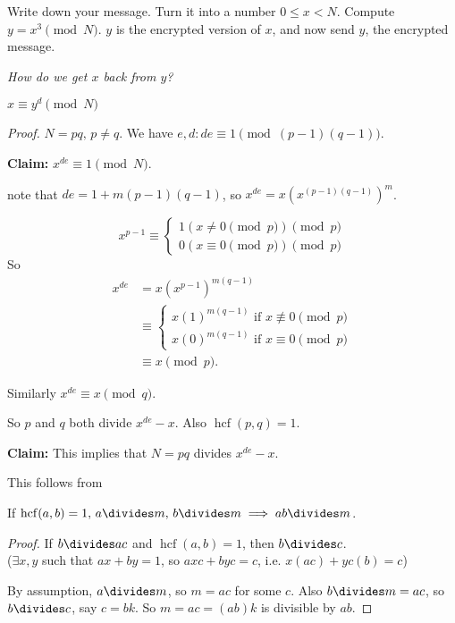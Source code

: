 \documentclass[twoside]{scrartcl}
\DeclareMathOperator{\hcf}{hcf}
\begin{document}
Write down your message. Turn it into a number $0 \leq x < N$. Compute $y= x^3 \pmod{N}$. $y$ is the encrypted version of $x$, and now send $y$, the encrypted message. 

\emph{How do we get $x$ back from $y$?}\\

\begin{theorem}
	$x \equiv y^d \pmod{N}$
\end{theorem}
\begin{proof}
$N = pq,\, p \neq q$. We have $e,d: de \equiv 1 \pmod{(p-1)(q-1)}$. 

\textbf{Claim:} $x^{de} \equiv 1 \pmod{N}$. 

note that $de = 1 + m(p-1)(q-1)$, so $x^{de} = x\left(x^{(p-1)(q-1)}\right)^m$. 

\[x^{p-1} \equiv \begin{cases}
 1 (x \neq 0 \pmod{p}) \pmod{p}\\
 0 ( x \equiv 0 \pmod{p}) \pmod{p}	
 \end{cases}
\]	
So 
\[
\begin{aligned}
  x^{de} &= x(x^{p-1})^{m(q-1)}\\
  &\equiv \begin{cases}
 x(1)^{m(q-1)} \text{ if } x \not\equiv 0 \pmod{p}\\
 x(0)^{m(q-1)} \text{ if } x \equiv 0 \pmod{p}
 \end{cases}\\
 &\equiv x \pmod{p}.	
 \end{aligned}
\]

Similarly $x^{de} \equiv x \pmod{q}$. 

So $p$ and $q$ both divide $x^{de} - x$. Also $\hcf(p,q) = 1$. 

\textbf{Claim:} This implies that $N = pq$ divides $x^{de} -x$. 

This follows from 
\begin{lemma}
If $\hcf(a,b) = 1,\, a \divides m,\, b \divides m \implies ab \divides m$. 	
\end{lemma}
\emph{Proof.} If $b\divides ac$ and $\hcf(a,b) = 1$, then $b \divides c$.\\ ($\exists x,y$ such that $ax + by = 1$, so $axc + byc = c$, i.e. $x(ac) + yc(b) = c$)

By assumption, $a \divides m$, so $m = ac$ for some $c$. Also $b \divides m = ac$, so $b \divides c$, say $c = bk$. So $m = ac = (ab)k$ is divisible by $ab$. 
\end{proof}
\end{document}
